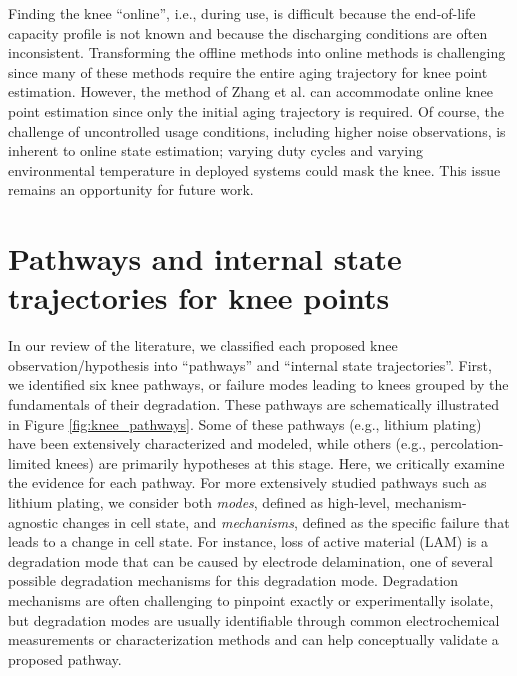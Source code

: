 \documentclass[journal=jpclcd,manuscript=article]{achemso}
\begin{document}
Finding the knee ``online'', i.e., during use, is difficult because the end-of-life capacity profile is not known and because the discharging conditions are often inconsistent. Transforming the offline methods into online methods is challenging since many of these methods require the entire aging trajectory for knee point estimation. However, the method of Zhang et al.\cite{zhang_accelerated_2019} can accommodate online knee point estimation since only the initial aging trajectory is required. Of course, the challenge of uncontrolled usage conditions, including higher noise observations\cite{aitio_predicting_2021}, is inherent to online state estimation; varying duty cycles and varying environmental temperature in deployed systems could mask the knee. This issue remains an opportunity for future work.



\section{Pathways and internal state trajectories for knee points}

In our review of the literature, we classified each proposed knee observation/hypothesis into ``pathways'' and ``internal state trajectories''.
First, we identified six knee pathways, or failure modes leading to knees grouped by the fundamentals of their degradation. These pathways are schematically illustrated in Figure \ref{fig:knee_pathways}. Some of these pathways (e.g., lithium plating) have been extensively characterized and modeled, while others (e.g., percolation-limited knees) are primarily hypotheses at this stage. Here, we critically examine the evidence for each pathway. For more extensively studied pathways such as lithium plating, we consider both \textit{modes}, defined as high-level, mechanism-agnostic changes in cell state, and \textit{mechanisms}, defined as the specific failure that leads to a change in cell state. For instance, loss of active material (LAM) is a degradation mode that can be caused by electrode delamination, one of several possible degradation mechanisms for this degradation mode. Degradation mechanisms are often challenging to pinpoint exactly or experimentally isolate, but degradation modes are usually identifiable through common electrochemical measurements or characterization methods and can help conceptually validate a proposed pathway.
\end{document}
